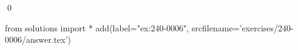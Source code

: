 
\begin{ex} 
  \label{ex:240-0006}
  
  \qed
\end{ex} 
\begin{python0}
from solutions import *
add(label="ex:240-0006",
    srcfilename='exercises/240-0006/answer.tex') 
\end{python0}
